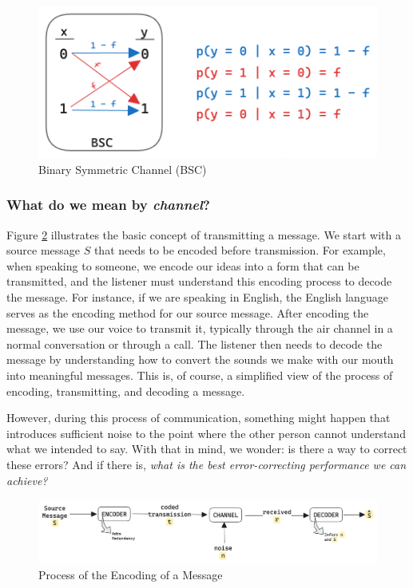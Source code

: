 \documentclass[a4paper,10pt]{article}
\newcommand{\hlt}[1]{\colorbox{color3}{#1}}
\begin{document}
\begin{figure}[ht]
\centering
\includegraphics[width=0.6\linewidth]{Figures/bsc.png}
\caption{Binary Symmetric Channel (BSC)}
\label{fig:bsc}
\end{figure}



\subsubsection{What do we mean by \emph{channel}?}

Figure \ref{fig:encoder_schematic} illustrates the basic concept of transmitting a message. We start with a source message $ S $ that needs to be encoded before transmission. For example, when speaking to someone, we encode our ideas into a form that can be transmitted, and the listener must understand this encoding process to decode the message. For instance, if we are speaking in English, the English language serves as the encoding method for our source message. After encoding the message, we use our voice to transmit it, typically through the air channel in a normal conversation or through a call. The listener then needs to decode the message by understanding how to convert the sounds we make with our mouth into meaningful messages. This is, of course, a simplified view of the process of encoding, transmitting, and decoding a message. 

However, during this process of communication, something might happen that introduces sufficient noise to the point where the other person cannot understand what we intended to say. With that in mind, we wonder: is there a way to correct these errors? And if there is, \textit{what is the \hlt{best error-correcting} performance we can achieve?}

\begin{figure}[ht]
\centering
\includegraphics[width=\linewidth]{Figures/encoder_schematic.png}
\caption{Process of the Encoding of a Message}
\label{fig:encoder_schematic}
\end{figure}
\end{document}
